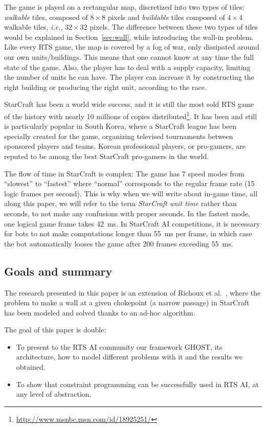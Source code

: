 \documentclass[journal]{IEEEtran}
\newcommand{\ghost}{\textsc{GHOST}\xspace}
\newcommand{\ie}{\textit{i.e.}}
\begin{document}
The game  is played on  a rectangular map,  discretized into two  types of
tiles: \emph{walkable}  tiles, composed of  $8 \times  8$ pixels and  \emph{buildable} tiles
composed of $4  \times 4$ walkable tiles, \ie, $32  \times 32$ pixels. The
difference  between these  two types  of tiles  would be  explained in
Section~\ref{sec:wall},  while introducing  the wall-in  problem. Like
every RTS game, the map is covered by a fog of war, only dissipated
around our own units/buildings. This means that one cannot know at any
time the full state of the game.   Also, the player has to deal with a
supply capacity, limiting the number of  units he can have. The player
can increase  it by constructing  the right building or  producing the
right unit, according to the race.

StarCraft has  been a world wide  success, and it is still  the most sold
RTS game of the history with nearly 10 millions of copies distributed\footnote{\url{http://www.msnbc.msn.com/id/18925251/}}. It has
been  and  still is  particularly  popular  in  South Korea,  where  a
StarCraft league has  been specially created for  the game, organizing
televised  tournaments between  sponsored players  and teams.   Korean
professional players, or pro-gamers, are  reputed to be among the best
StarCraft pro-gamers in the world.

The flow of time in StarCraft is complex:  The game has 7  speed modes from
``slowest'' to ``fastest'' where ``normal'' corresponds to the regular
 frame rate  (15 logic frames per  second). This is why when we will  write about in-game time, all along this
paper, we will refer to the term \emph{StarCraft unit time} rather than
seconds, to not make any confusions with proper seconds. In the fastest
mode, one logical game  frame takes 42~ms. In StarCraft AI  competitions, it is
necessary  for bots  to not  make  computations longer  than 55~ms  per
frame, in which  case the bot automatically looses the  game after 200
frames exceeding 55~ms.

\subsection{Goals and summary}

The research  presented in this  paper is  an extension of  Richoux et
al.~\cite{RichouxUO14}, where  the problem to  make a wall at  a given
chokepoint (a narrow passage) in StarCraft  has been  modeled  and solved  thanks to  an
ad-hoc algorithm.

The goal of this paper is double:
\begin{itemize}
\item  To present  to  the RTS  AI community  our  framework \ghost,  its
  architecture,  how  to model  different  problems  with it  and  the
  results we obtained.
\item To show that constraint  programming can be successfully used in
  RTS AI, at any level of abstraction.
\end{itemize}
\end{document}
